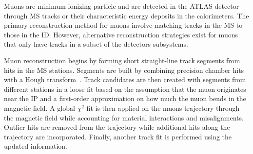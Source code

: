 Muons are minimum-ionizing particle and are detected in the ATLAS detector through MS tracks or their characteristic energy deposits in the calorimeters. The primary reconstruction method for muons involve matching tracks in the MS to those in the ID\@. However, alternative reconstruction strategies exist for muons that only have tracks in a subset of the detectors subsystems.

Muon reconstruction begins by forming short straight-line track segments from hits in the MS stations. Segments are built by combining precision chamber hits with a Hough transform~\cite{ILLINGWORTH198887}. Track candidates are then created with segments from different stations in a loose fit based on the assumption that the muon originates near the IP and a first-order approximation on how much the muon bends in the magnetic field. A global $\chi^{2}$ fit is then applied on the muons trajectory through the magnetic field while accounting for material interactions and misalignments. Outlier hits are removed from the trajectory while additional hits along the trajectory are incorporated. Finally, another track fit is performed using the updated information.

